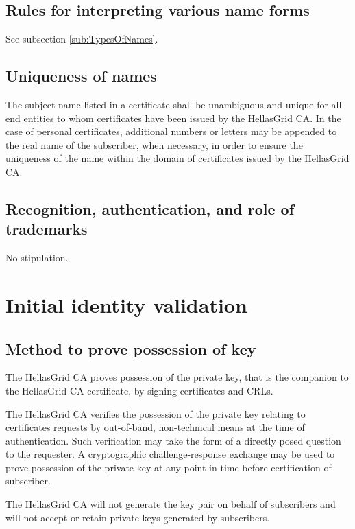 \subsection{Rules for interpreting various name forms}

See subsection \ref{sub:TypesOfNames}.

\subsection{Uniqueness of names}
\label{sub:UniquenessOfNames}

The subject name listed in a certificate shall be unambiguous and unique for all end entities to whom certificates have been issued by the HellasGrid CA. In the case of personal certificates, additional numbers or letters may be appended to the real name of the subscriber, when necessary, in order to ensure the uniqueness of the name within the domain of certificates issued by the HellasGrid CA.
 
\subsection{Recognition, authentication, and role of trademarks}

No stipulation. 

\section{Initial identity validation}


\subsection{Method to prove possession of key}

The HellasGrid CA proves possession of the private key, that is the companion to the HellasGrid CA certificate, by signing certificates and CRLs.

The HellasGrid CA verifies the possession of the private key relating to certificates requests by out-of-band, non-technical means at the time of authentication. Such verification may take the form of a directly posed question to the requester. A cryptographic challenge-response exchange may be used to prove possession of the private key at any point in time before certification of subscriber.

The HellasGrid CA will not generate the key pair on behalf of subscribers and will not accept or retain private keys generated by subscribers.

